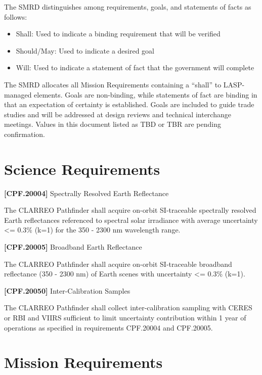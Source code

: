 The \gls{SMRD} distinguishes among requirements, goals, and statements of facts as follows:

\begin{itemize}
\item{} Shall: Used to indicate a binding requirement that will be verified

\item{} Should\slash May: Used to indicate a desired goal

\item{} Will: Used to indicate a statement of fact that the government will complete

\end{itemize}

The \gls{SMRD} allocates all Mission Requirements containing a ``shall'' to \gls{LASP}-managed elements. Goals are non-binding, while statements of fact are binding in that an expectation of certainty is established. Goals are included to guide trade studies and will be addressed at design reviews and technical interchange meetings. Values in this document listed as TBD or TBR are pending confirmation.

\section{Science Requirements}
\label{sciencerequirements}

\textbf{[CPF.20004]} Spectrally Resolved Earth Reflectance

The \gls{CLARREO} Pathfinder shall acquire on-orbit \gls{SI}-traceable spectrally resolved Earth reflectances referenced to spectral solar irradiance with average uncertainty <= 0.3\% (k=1) for the 350 - 2300 nm wavelength range.

\textbf{[CPF.20005]} Broadband Earth Reflectance

The \gls{CLARREO} Pathfinder shall acquire on-orbit \gls{SI}-traceable broadband reflectance (350 - 2300 nm) of Earth scenes with uncertainty <= 0.3\% (k=1).

\textbf{[CPF.20050]} Inter-Calibration Samples

The \gls{CLARREO} Pathfinder shall \gls{collect} inter-calibration sampling with \gls{CERES} or \gls{RBI} and \gls{VIIRS} sufficient to limit uncertainty contribution within 1 year of operations as specified in requirements \gls{CPF}.20004 and \gls{CPF}.20005.

\section{Mission Requirements}
\label{missionrequirements}

